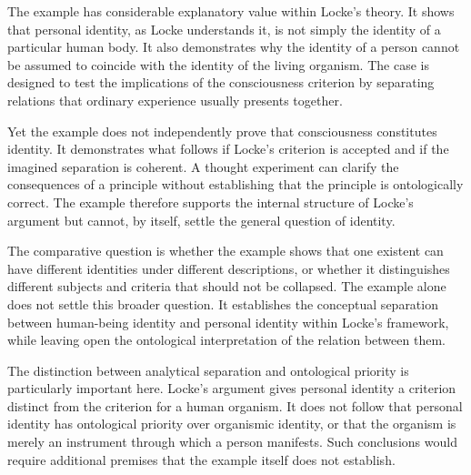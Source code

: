 The example has considerable explanatory value
within Locke's theory. It shows that personal
identity, as Locke understands it, is not simply
the identity of a particular human body. It also
demonstrates why the identity of a person cannot
be assumed to coincide with the identity of the
living organism. The case is designed to test
the implications of the consciousness criterion
by separating relations that ordinary experience
usually presents together.

\label{para:VS.B01.P01.C08.S08.SS09.P004}

Yet the example does not independently prove
that consciousness constitutes identity. It
demonstrates what follows if Locke's criterion
is accepted and if the imagined separation is
coherent. A thought experiment can clarify the
consequences of a principle without establishing
that the principle is ontologically correct.
The example therefore supports the internal
structure of Locke's argument but cannot, by
itself, settle the general question of identity.

\label{para:VS.B01.P01.C08.S08.SS09.P005}

The comparative question is whether the example
shows that one existent can have different
identities under different descriptions, or
whether it distinguishes different subjects
and criteria that should not be collapsed.
The example alone does not settle this broader
question. It establishes the conceptual separation
between human-being identity and personal identity
within Locke's framework, while leaving open
the ontological interpretation of the relation
between them.

\label{para:VS.B01.P01.C08.S08.SS09.P006}

The distinction between analytical separation
and ontological priority is particularly important
here. Locke's argument gives personal identity
a criterion distinct from the criterion for a
human organism. It does not follow that personal
identity has ontological priority over organismic
identity, or that the organism is merely an
instrument through which a person manifests.
Such conclusions would require additional premises
that the example itself does not establish.



